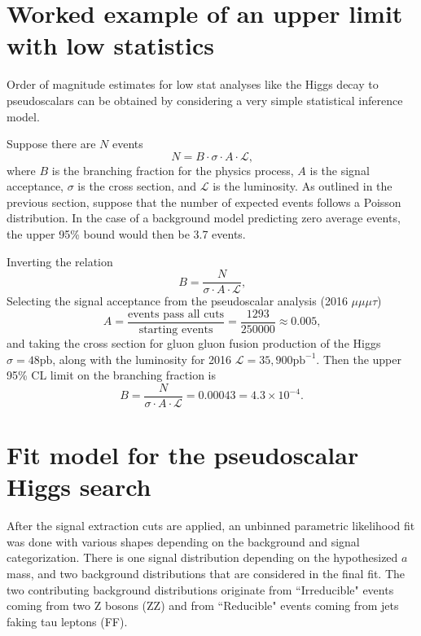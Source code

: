 \section{Worked example of an upper limit with low statistics}
Order of magnitude estimates for low stat analyses like the Higgs decay to pseudoscalars can be obtained by considering a very simple statistical inference model. 

Suppose there are $N$ events 
\begin{equation}
\label{eq:Nevents}
N = B\cdot \sigma \cdot A\cdot \mathcal{L} \text{,}
\end{equation}
where $B$ is the branching fraction for the physics process, $A$ is the signal acceptance, $\sigma$ is the cross section, and $\mathcal{L}$ is the luminosity.
As outlined in the previous section, suppose that the number of expected events follows a Poisson distribution. In the case of a background model predicting zero average events, the upper 95\% bound would then be 3.7 events. 

Inverting the relation
\begin{equation}B = \frac{N}{\sigma \cdot A\cdot \mathcal{L}} \text{,} \end{equation}
Selecting the signal acceptance from the pseudoscalar analysis (2016 $\mu\mu\mu\tau$) 
\begin{equation} A = \frac{\text{events pass all cuts}}{\text{starting events}} = \frac{1293}{250000} \approx 0.005 \text{,}\end{equation}
and taking the cross section for gluon gluon fusion production of the Higgs $\sigma = 48 \text{pb}$, along with the luminosity for 2016 $\mathcal{L} = 35,900 \text{pb}^{-1}$. Then the upper 95\% CL limit on the branching fraction is 
\begin{equation}B =  \frac{N}{\sigma \cdot A\cdot \mathcal{L}} = 0.00043 = 4.3 \times 10^{-4}\text{.}\end{equation}



\section{Fit model for the pseudoscalar Higgs search}
\label{sec:fitmodel}
After the signal extraction cuts are applied, an unbinned parametric likelihood fit was done with various shapes depending on the background and signal categorization. There is one signal distribution depending on the hypothesized $a$ mass, and two background distributions that are considered in the final fit. The two contributing background distributions originate from ``Irreducible" events coming from two Z bosons (ZZ) and from ``Reducible" events coming from jets faking tau leptons (FF).  

